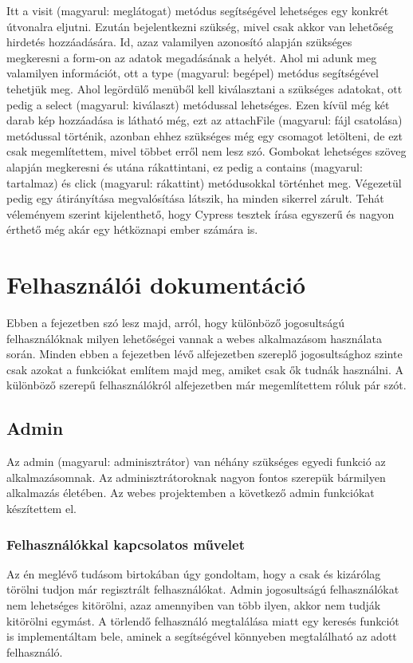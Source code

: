 \documentclass[]{thesis-ekf}
\theoremstyle{definition}
\theoremstyle{remark}
\begin{document}
		
		
		Itt a visit (magyarul: meglátogat) metódus segítségével lehetséges egy konkrét útvonalra eljutni. Ezután bejelentkezni szükség, mivel csak akkor van lehetőség hirdetés hozzáadására. Id, azaz valamilyen azonosító alapján szükséges megkeresni a form-on az adatok megadásának a helyét. Ahol mi adunk meg valamilyen információt, ott a type (magyarul: begépel) metódus segítségével tehetjük meg. Ahol legördülő menüből kell kiválasztani a szükséges adatokat, ott pedig a select (magyarul: kiválaszt) metódussal lehetséges. Ezen kívül még két darab kép hozzáadása is látható még, ezt az attachFile (magyarul: fájl csatolása) metódussal történik, azonban ehhez szükséges még egy csomagot letölteni, de ezt csak megemlítettem, mivel többet erről nem lesz szó. Gombokat lehetséges szöveg alapján megkeresni és utána rákattintani, ez pedig a contains (magyarul: tartalmaz) és click (magyarul: rákattint) metódusokkal történhet meg. Végezetül pedig egy átirányítása megvalósítása látszik, ha minden sikerrel zárult. Tehát véleményem szerint kijelenthető, hogy Cypress tesztek írása egyszerű és nagyon érthető még akár egy hétköznapi ember számára is.
		
	\chapter{Felhasználói dokumentáció}
		Ebben a fejezetben szó lesz majd, arról, hogy különböző jogosultságú felhasználóknak milyen lehetőségei vannak a webes alkalmazásom használata során. Minden ebben a fejezetben lévő alfejezetben szereplő jogosultsághoz szinte csak azokat a funkciókat említem majd meg, amiket csak ők tudnák használni. A különböző szerepű felhasználókról \az{\ref{sc-plantuml}} alfejezetben már megemlítettem róluk pár szót.
	\section{Admin}
		Az admin (magyarul: adminisztrátor) van néhány szükséges egyedi funkció az alkalmazásomnak. Az adminisztrátoroknak nagyon fontos szerepük bármilyen alkalmazás életében. Az webes projektemben a következő admin funkciókat készítettem el.
	\subsection{Felhasználókkal kapcsolatos művelet}
		Az én meglévő tudásom birtokában úgy gondoltam, hogy a csak és kizárólag törölni tudjon már regisztrált felhasználókat. Admin jogosultságú felhasználókat nem lehetséges kitörölni, azaz amennyiben van több ilyen, akkor nem tudják kitörölni egymást. A törlendő felhasználó megtalálása miatt egy keresés funkciót is implementáltam bele, aminek a segítségével könnyeben megtalálható az adott felhasználó.
\end{document}
